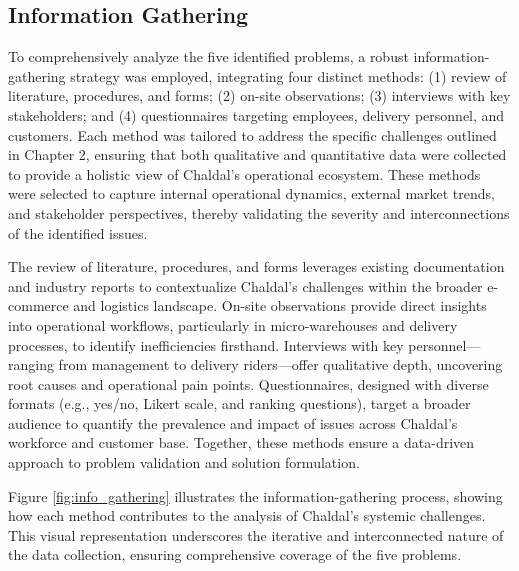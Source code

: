 \documentclass[12pt,a4paper]{article}
\begin{document}
\subsection{Information Gathering}
To comprehensively analyze the five identified problems, a robust information-gathering strategy was employed, integrating four distinct methods: (1) review of literature, procedures, and forms; (2) on-site observations; (3) interviews with key stakeholders; and (4) questionnaires targeting employees, delivery personnel, and customers. Each method was tailored to address the specific challenges outlined in Chapter 2, ensuring that both qualitative and quantitative data were collected to provide a holistic view of Chaldal’s operational ecosystem. These methods were selected to capture internal operational dynamics, external market trends, and stakeholder perspectives, thereby validating the severity and interconnections of the identified issues.

The review of literature, procedures, and forms leverages existing documentation and industry reports to contextualize Chaldal’s challenges within the broader e-commerce and logistics landscape. On-site observations provide direct insights into operational workflows, particularly in micro-warehouses and delivery processes, to identify inefficiencies firsthand. Interviews with key personnel—ranging from management to delivery riders—offer qualitative depth, uncovering root causes and operational pain points. Questionnaires, designed with diverse formats (e.g., yes/no, Likert scale, and ranking questions), target a broader audience to quantify the prevalence and impact of issues across Chaldal’s workforce and customer base. Together, these methods ensure a data-driven approach to problem validation and solution formulation.

Figure \ref{fig:info_gathering} illustrates the information-gathering process, showing how each method contributes to the analysis of Chaldal’s systemic challenges. This visual representation underscores the iterative and interconnected nature of the data collection, ensuring comprehensive coverage of the five problems.
\end{document}
